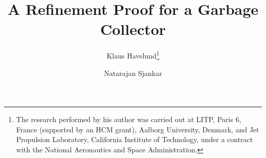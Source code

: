 \documentclass{llncs}
\begin{document}
\title{A Refinement Proof for a Garbage Collector}

\author{ 
Klaus Havelund\thanks{The research 
performed by his author was carried out at
LITP, Paris 6, France (supported by an HCM grant), 
Aalborg University, Denmark,
and Jet Propulsion Laboratory, California 
Institute of Technology, under a contract with the National Aeronautics 
and Space Administration.}
\and
Natarajan Sjankar
}





\maketitle














\appendix
{}


\end{document}
